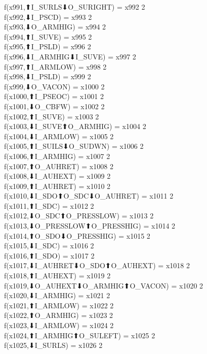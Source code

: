 f(x991,⬆I_SURLS⬇O_SURIGHT) = x992 {2} \\
f(x992,⬇I_PSCD) = x993 {2} \\
f(x993,⬇O_ARMHIG) = x994 {2} \\
f(x994,⬆I_SUVE) = x995 {2} \\
f(x995,⬆I_PSLD) = x996 {2} \\
f(x996,⬇I_ARMHIG⬇I_SUVE) = x997 {2} \\
f(x997,⬆I_ARMLOW) = x998 {2} \\
f(x998,⬇I_PSLD) = x999 {2} \\
f(x999,⬇O_VACON) = x1000 {2} \\
f(x1000,⬆I_PSEOC) = x1001 {2} \\
f(x1001,⬇O_CBFW) = x1002 {2} \\
f(x1002,⬆I_SUVE) = x1003 {2} \\
f(x1003,⬇I_SUVE⬆O_ARMHIG) = x1004 {2} \\
f(x1004,⬇I_ARMLOW) = x1005 {2} \\
f(x1005,⬆I_SUILS⬇O_SUDWN) = x1006 {2} \\
f(x1006,⬆I_ARMHIG) = x1007 {2} \\
f(x1007,⬆O_AUHRET) = x1008 {2} \\
f(x1008,⬇I_AUHEXT) = x1009 {2} \\
f(x1009,⬆I_AUHRET) = x1010 {2} \\
f(x1010,⬇I_SDO⬆O_SDC⬇O_AUHRET) = x1011 {2} \\
f(x1011,⬆I_SDC) = x1012 {2} \\
f(x1012,⬇O_SDC⬆O_PRESSLOW) = x1013 {2} \\
f(x1013,⬇O_PRESSLOW⬆O_PRESSHIG) = x1014 {2} \\
f(x1014,⬆O_SDO⬇O_PRESSHIG) = x1015 {2} \\
f(x1015,⬇I_SDC) = x1016 {2} \\
f(x1016,⬆I_SDO) = x1017 {2} \\
f(x1017,⬇I_AUHRET⬇O_SDO⬆O_AUHEXT) = x1018 {2} \\
f(x1018,⬆I_AUHEXT) = x1019 {2} \\
f(x1019,⬇O_AUHEXT⬇O_ARMHIG⬆O_VACON) = x1020 {2} \\
f(x1020,⬇I_ARMHIG) = x1021 {2} \\
f(x1021,⬆I_ARMLOW) = x1022 {2} \\
f(x1022,⬆O_ARMHIG) = x1023 {2} \\
f(x1023,⬇I_ARMLOW) = x1024 {2} \\
f(x1024,⬆I_ARMHIG⬆O_SULEFT) = x1025 {2} \\
f(x1025,⬇I_SURLS) = x1026 {2} \\
